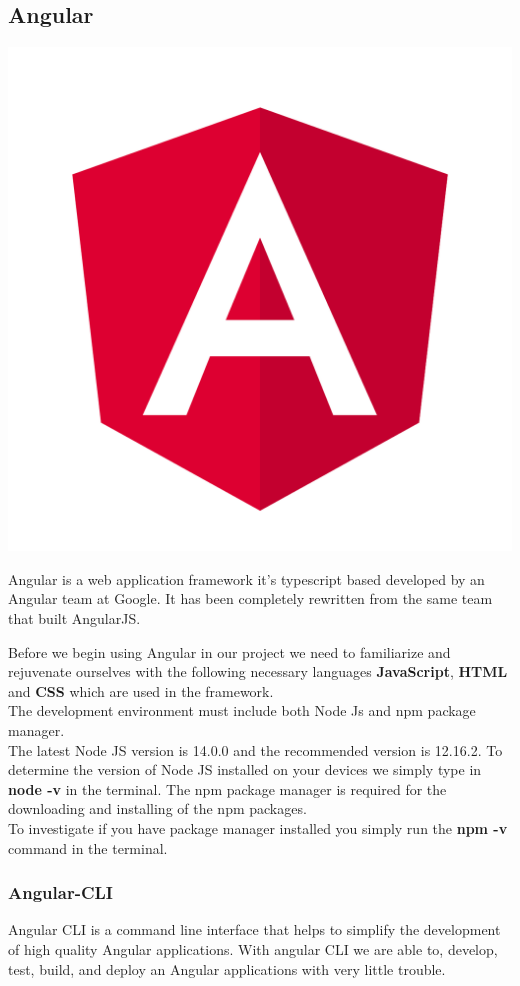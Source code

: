 \documentclass[a4paper,12pt]{report}
\begin{document}
\subsection{Angular}
\includegraphics[scale=.015]{images/angular.png}

Angular is a web application framework it's typescript based developed by an Angular team at Google.
It has been completely rewritten from the same team that built AngularJS.

Before we begin using Angular in our project we need to familiarize and rejuvenate ourselves with the following necessary languages \textbf{JavaScript}, \textbf{HTML} and \textbf{CSS} which are used in the framework.\\
The development environment must include both Node Js and npm package manager.\\
The latest Node JS version is 14.0.0 and the recommended version is 12.16.2. To determine the version of Node JS installed on your devices we simply type in \textbf{node -v} in the terminal.
The npm package manager is required for the downloading and installing of the npm packages.
\\To investigate if you have package manager installed you simply run the \textbf{npm -v} command in the terminal.\cite{angularSetup}

\subsubsection{Angular-CLI}
Angular CLI is a  command line interface that helps to simplify the development of high quality Angular applications. 
With angular CLI we are able to, develop, test, build, and deploy an Angular applications with very little trouble.
\end{document}
